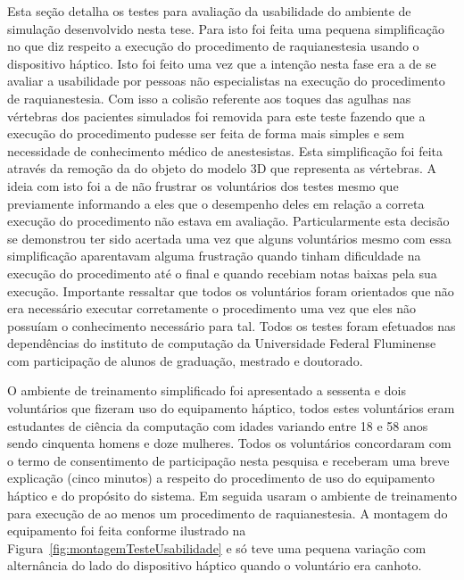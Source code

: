 Esta seção detalha os testes para avaliação da usabilidade do ambiente de simulação desenvolvido nesta tese. Para isto foi feita uma pequena simplificação no que diz respeito a execução do procedimento de raquianestesia usando o dispositivo háptico. Isto foi feito uma vez que a intenção nesta fase era a de se avaliar a usabilidade por pessoas não especialistas na execução do procedimento de raquianestesia. Com isso a colisão referente aos toques das agulhas nas vértebras dos pacientes simulados foi removida para este teste fazendo que a execução do procedimento pudesse ser feita de forma mais simples e sem necessidade de conhecimento médico de anestesistas. Esta simplificação foi feita através da remoção da  do objeto do modelo 3D que representa as vértebras. 
A ideia com isto foi a de não frustrar os voluntários dos testes mesmo que previamente informando a eles que o desempenho deles em relação a correta execução do procedimento não estava em avaliação. Particularmente esta decisão se demonstrou ter sido acertada uma vez que alguns voluntários mesmo com essa simplificação aparentavam alguma frustração quando tinham dificuldade na execução do procedimento até o final e quando recebiam notas baixas pela sua execução. Importante ressaltar que todos os voluntários foram orientados que não era necessário executar corretamente o procedimento uma vez que eles não possuíam o conhecimento necessário para tal. Todos os testes foram efetuados nas dependências do instituto de computação da Universidade Federal Fluminense com participação de alunos de graduação, mestrado e doutorado.

O ambiente de treinamento simplificado foi apresentado a sessenta e dois voluntários que fizeram uso do equipamento háptico, todos estes voluntários eram estudantes de ciência da computação com idades variando entre 18 e 58 anos sendo cinquenta homens e doze mulheres. Todos os voluntários concordaram com o termo de consentimento de participação nesta pesquisa e receberam uma breve explicação (cinco minutos) a respeito do procedimento de uso do equipamento háptico e do propósito do sistema. Em seguida usaram o ambiente de treinamento para execução de ao menos um procedimento de raquianestesia. A montagem do equipamento foi feita conforme ilustrado na Figura~\ref{fig:montagemTesteUsabilidade} e só teve uma pequena variação com alternância do lado do dispositivo háptico quando o voluntário era canhoto.

